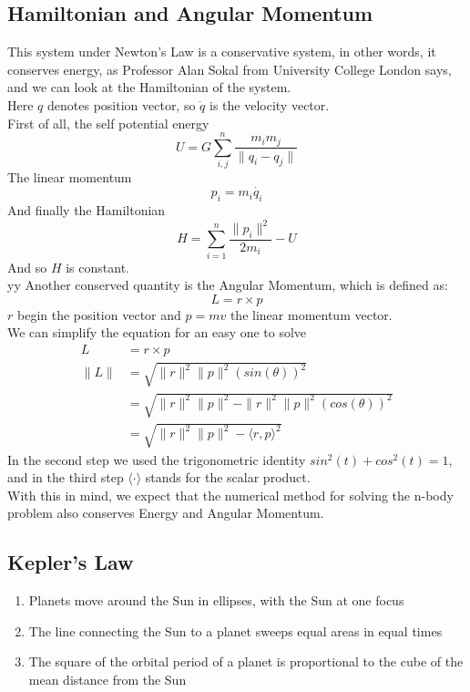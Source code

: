 \documentclass[12pt]{article}
\begin{document}
\subsection{Hamiltonian and Angular Momentum}
This system under Newton's Law is a conservative system, in other words, it conserves energy, as Professor Alan Sokal from University College London says, and we can look at the Hamiltonian of the system.\\
Here \(q\) denotes position vector, so \(\dot{q}\) is the velocity vector. \\
First of all, the self potential energy
\[
U = G \displaystyle \sum_{i,j}^n \frac{m_i m_j}{\lVert q_i - q_j \rVert}
\]
The linear momentum
\[
p_i = m_i \dot{q_i}
\]
And finally the Hamiltonian
\[
H = \displaystyle \sum_{i = 1}^{n} \frac{\lVert p_i \rVert ^2}{2m_i} - U
\]
And so \(H\) is constant.\\ yy 
Another conserved quantity is the Angular Momentum, which is defined as:
\[
L = r \times p
\]
\(r\) begin the position vector and \(p = mv\) the linear momentum vector.\\
We can simplify the equation for an easy one to solve
\begin{align*}
  L &= r \times p\\
  \lVert L \rVert &= \sqrt{\rVert r \lVert^2 \rVert p \lVert^2(sin(\theta))^2} \\
  &= \sqrt{\rVert r \lVert^2 \rVert p \lVert^2 - \rVert r \lVert^2 \rVert p \lVert^2(cos(\theta))^2} \\
  &= \sqrt{\rVert r \lVert^2 \rVert p \lVert^2 - \langle r, p \rangle ^2}
\end{align*}
In the second step we used the trigonometric identity \(sin^2 (t) + cos^2(t) = 1\), and in the third step \(\langle \cdot \rangle\) stands for the scalar product.\\
With this in mind, we expect that the numerical method for solving the n-body problem also conserves Energy and Angular Momentum.

\subsection{Kepler's Law}
\begin{enumerate}
  \item Planets move around the Sun in ellipses, with the Sun at one focus
  \item The line connecting the Sun to a planet sweeps equal areas in equal times
  \item The square of the orbital period of a planet is proportional to the cube of the mean distance from the Sun
\end{enumerate}
\end{document}

